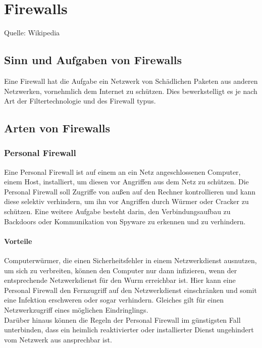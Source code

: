 \chapter{Firewalls}
Quelle: Wikipedia
\section{Sinn und Aufgaben von Firewalls}
Eine Firewall hat die Aufgabe ein Netzwerk von Schädlichen Paketen aus anderen Netzwerken, vornehmlich dem Internet zu schützen. Dies bewerkstelligt es je nach Art der Filtertechnologie und des Firewall typus.
\section{Arten von Firewalls}
\subsection{Personal Firewall}
Eine Personal Firewall ist auf einem an ein Netz angeschlossenen Computer, einem Host, installiert, um diesen vor Angriffen aus dem Netz zu schützen. Die Personal Firewall soll Zugriffe von außen auf den Rechner kontrollieren und kann diese selektiv verhindern, um ihn vor Angriffen durch Würmer oder Cracker zu schützen. Eine weitere Aufgabe besteht darin, den Verbindungsaufbau zu Backdoors oder Kommunikation von Spyware zu erkennen und zu verhindern.\\
\subsubsection{Vorteile}
Computerwürmer, die einen Sicherheitsfehler in einem Netzwerkdienst ausnutzen, um sich zu verbreiten, können den Computer nur dann infizieren, wenn der entsprechende Netzwerkdienst für den Wurm erreichbar ist. Hier kann eine Personal Firewall den Fernzugriff auf den Netzwerkdienst einschränken und somit eine Infektion erschweren oder sogar verhindern. Gleiches gilt für einen Netzwerkzugriff eines möglichen Eindringlings.\\
Darüber hinaus können die Regeln der Personal Firewall im günstigsten Fall unterbinden, dass ein heimlich reaktivierter oder installierter Dienst ungehindert vom Netzwerk aus ansprechbar ist.
